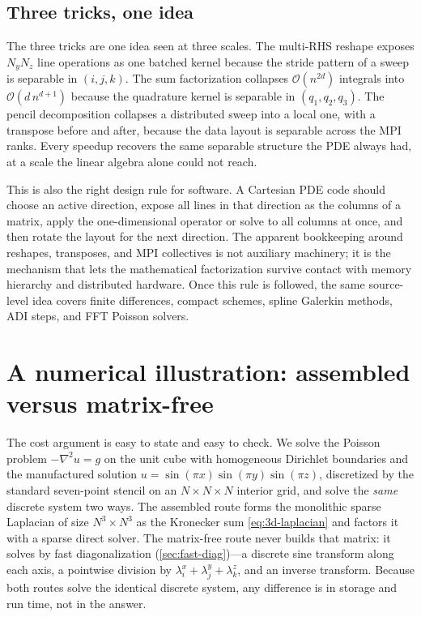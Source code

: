 \documentclass[11pt]{article}
\newcommand{\bigO}{\mathcal{O}}
\begin{document}
\subsection{Three tricks, one idea}

The three tricks are one idea seen at three scales.  The multi-RHS
reshape exposes $N_y N_z$ line operations as one batched kernel because
the stride pattern of a sweep is separable in $(i,j,k)$.  The sum
factorization collapses $\bigO(n^{2d})$ integrals into
$\bigO(d\,n^{d+1})$ because the quadrature kernel is separable in
$(q_1,q_2,q_3)$.  The pencil decomposition collapses a distributed
sweep into a local one, with a transpose before and after, because the
data layout is separable across the MPI ranks.  Every speedup recovers
the same separable structure the PDE always had, at a scale the linear
algebra alone could not reach.

This is also the right design rule for software.  A Cartesian PDE code
should choose an active direction, expose all lines in that direction
as the columns of a matrix, apply the one-dimensional operator or solve
to all columns at once, and then rotate the layout for the next
direction.  The apparent bookkeeping around reshapes, transposes, and
MPI collectives is not auxiliary machinery; it is the mechanism that
lets the mathematical factorization survive contact with memory
hierarchy and distributed hardware.  Once this rule is followed, the
same source-level idea covers finite differences, compact schemes,
spline Galerkin methods, ADI steps, and FFT Poisson solvers.


\section{A numerical illustration: assembled versus matrix-free}
\label{sec:experiment}

The cost argument is easy to state and easy to check.  We solve the
Poisson problem $-\nabla^2 u = g$ on the unit cube with homogeneous
Dirichlet boundaries and the manufactured solution
$u = \sin(\pi x)\sin(\pi y)\sin(\pi z)$, discretized by the standard
seven-point stencil on an $N\times N\times N$ interior grid, and solve the
\emph{same} discrete system two ways.  The assembled route forms the
monolithic sparse Laplacian of size $N^3\times N^3$ as the Kronecker sum
\eqref{eq:3d-laplacian} and factors it with a sparse direct solver.  The
matrix-free route never builds that matrix: it solves by fast
diagonalization (\cref{sec:fast-diag})---a discrete sine transform along
each axis, a pointwise division by
$\lambda_i^x+\lambda_j^y+\lambda_k^z$, and an inverse transform.  Because
both routes solve the identical discrete system, any difference is in
storage and run time, not in the answer.
\end{document}
